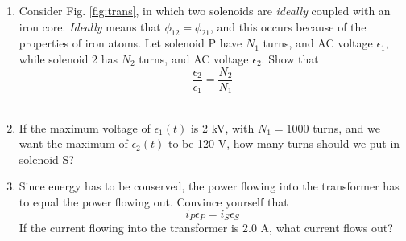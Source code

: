 \documentclass{article}
\begin{document}
\begin{enumerate}
\item Consider Fig. \ref{fig:trans}, in which two solenoids are \textit{ideally} coupled with an iron core.  \textit{Ideally} means that $\phi_{12} = \phi_{21}$, and this occurs because of the properties of iron atoms.  Let solenoid P have $N_1$ turns, and AC voltage $\epsilon_1$, while solenoid 2 has $N_2$ turns, and AC voltage $\epsilon_2$.  Show that 
\begin{equation}
\frac{\epsilon_2}{\epsilon_1} = \frac{N_2}{N_1}
\end{equation} \\ \vspace{1cm}
\item If the maximum voltage of $\epsilon_1(t)$ is 2 kV, with $N_1 = 1000$ turns, and we want the maximum of $\epsilon_2(t)$ to be 120 V, how many turns should we put in solenoid S? \\ \vspace{1.5cm}
\item Since energy has to be conserved, the power flowing into the transformer has to equal the power flowing out.  Convince yourself that
\begin{equation}
i_P \epsilon_P = i_S \epsilon_S
\end{equation}
If the current flowing into the transformer is 2.0 A, what current flows out?
\end{enumerate}
\end{document}

